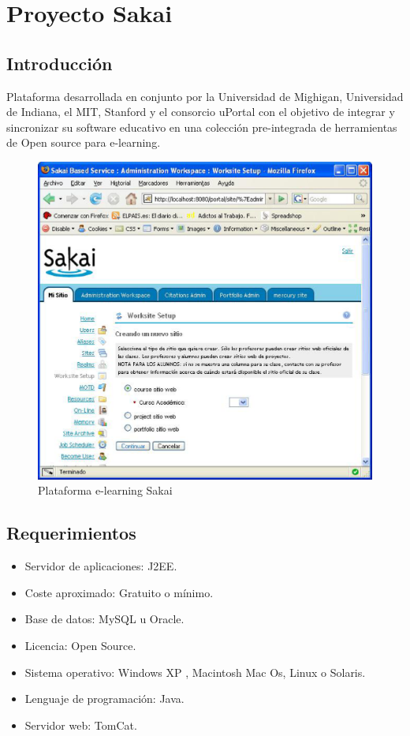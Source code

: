 \section{Proyecto Sakai}

\subsection{Introducción}

Plataforma desarrollada en conjunto por la Universidad de Mighigan, Universidad de Indiana, el MIT, Stanford y el consorcio uPortal con el objetivo de integrar y sincronizar su software educativo en una colección pre-integrada de herramientas de Open source para e-learning.

\begin{figure}[h]
	\includegraphics[width=\textwidth]{./img/c2-proyectosakai.eps}
	\caption{Plataforma e-learning Sakai}
\end{figure}

\subsection{Requerimientos}

\begin{itemize}
	\item Servidor de aplicaciones: J2EE.
	\item Coste aproximado: Gratuito o mínimo.
	\item Base de datos: MySQL u Oracle.
	\item Licencia: Open Source.
	\item Sistema operativo: Windows XP , Macintosh Mac Os, Linux o Solaris. 
	\item Lenguaje de programación: Java.
	\item Servidor web: TomCat.
\end{itemize}

